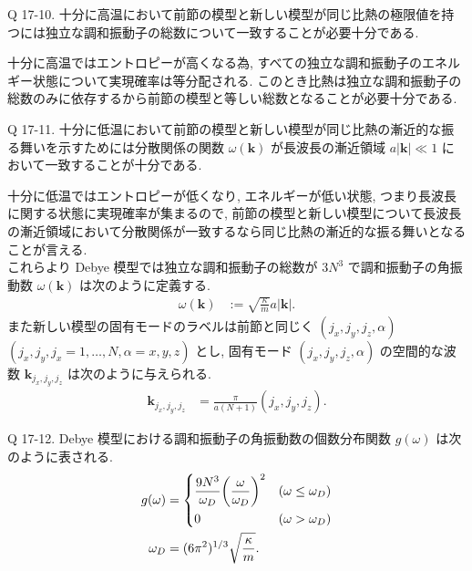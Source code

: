 \documentclass[uplatex,dvipdfmx,a4paper,11pt]{jlreq}
\theoremstyle{definition}
\begin{document}
\begin{itembox}[l]{Q 17-10.}
  十分に高温において前節の模型と新しい模型が同じ比熱の極限値を持つには独立な調和振動子の総数について一致することが必要十分である.
\end{itembox}

十分に高温ではエントロピーが高くなる為, すべての独立な調和振動子のエネルギー状態について実現確率は等分配される. このとき比熱は独立な調和振動子の総数のみに依存するから前節の模型と等しい総数となることが必要十分である.

\begin{itembox}[l]{Q 17-11.}
  十分に低温において前節の模型と新しい模型が同じ比熱の漸近的な振る舞いを示すためには分散関係の関数 $\omega(\bm{k})$ が長波長の漸近領域 $a|\bm{k}| \ll 1$ において一致することが十分である.
\end{itembox}

十分に低温ではエントロピーが低くなり, エネルギーが低い状態, つまり長波長に関する状態に実現確率が集まるので, 前節の模型と新しい模型について長波長の漸近領域において分散関係が一致するなら同じ比熱の漸近的な振る舞いとなることが言える. \\

これらより Debye 模型では独立な調和振動子の総数が $3N^3$ で調和振動子の角振動数 $\omega(\bm{k})$ は次のように定義する.
\begin{align}
  \omega(\bm{k}) & := \sqrt{\frac{\kappa}{m}}a|\bm{k}|.
\end{align}
また新しい模型の固有モードのラベルは前節と同じく $(j_x, j_y, j_z, \alpha)$ $(j_x,j_y,j_x=1,\ldots,N,\alpha=x,y,z)$ とし, 固有モード $(j_x, j_y, j_z, \alpha)$ の空間的な波数 $\bm{k}_{j_x,j_y,j_z}$ は次のように与えられる.
\begin{align}
  \bm{k}_{j_x,j_y,j_z} & = \frac{\pi}{a(N+1)}(j_x,j_y,j_z).
\end{align}

\begin{itembox}[l]{Q 17-12.}
  Debye 模型における調和振動子の角振動数の個数分布関数 $g(\omega)$ は次のように表される.
  \begin{align}
    g(\omega) & = \begin{dcases}
                    \frac{9N^3}{\omega_D}\qty(\frac{\omega}{\omega_D})^2 & (\omega\leq\omega_D) \\
                    0                                                    & (\omega > \omega_D)
                  \end{dcases} \\
    \omega_D  & = (6\pi^2)^{1/3}\sqrt{\frac{\kappa}{m}}.
  \end{align}
\end{itembox}
\end{document}
